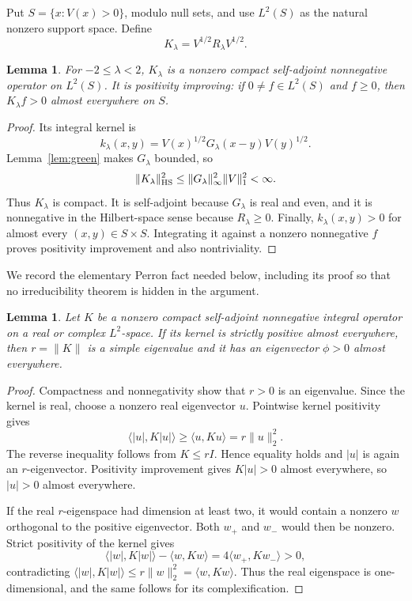 \documentclass[11pt]{article}
\newtheorem{lemma}[theorem]{Lemma}
\begin{document}
Put $S=\{x:V(x)>0\}$, modulo null sets, and use $L^2(S)$ as the natural
nonzero support space.  Define
\[
 K_\lambda=V^{1/2}R_\lambda V^{1/2}.
\]

\begin{lemma}\label{lem:K}
For $-2\le\lambda<2$, $K_\lambda$ is a nonzero compact self-adjoint
nonnegative operator on $L^2(S)$.  It is positivity improving: if
$0\ne f\in L^2(S)$ and $f\ge0$, then $K_\lambda f>0$ almost everywhere on
$S$.
\end{lemma}

\begin{proof}
Its integral kernel is
\[
 k_\lambda(x,y)=V(x)^{1/2}G_\lambda(x-y)V(y)^{1/2}.
\]
Lemma~\ref{lem:green} makes $G_\lambda$ bounded, so
\[
 \|K_\lambda\|_{\rm HS}^2
 \le \|G_\lambda\|_\infty^2\|V\|_1^2<\infty.
\]
Thus $K_\lambda$ is compact.  It is self-adjoint because $G_\lambda$ is real
and even, and it is nonnegative in the Hilbert-space sense because
$R_\lambda\ge0$.  Finally, $k_\lambda(x,y)>0$ for almost every $(x,y)\in
S\times S$.  Integrating it against a nonzero nonnegative $f$ proves
positivity improvement and also nontriviality.
\end{proof}

We record the elementary Perron fact needed below, including its proof so that
no irreducibility theorem is hidden in the argument.

\begin{lemma}\label{lem:perron}
Let $K$ be a nonzero compact self-adjoint nonnegative integral operator on a
real or complex $L^2$-space.  If its kernel is strictly positive almost
everywhere, then $r=\|K\|$ is a simple eigenvalue and it has an eigenvector
$\phi>0$ almost everywhere.
\end{lemma}

\begin{proof}
Compactness and nonnegativity show that $r>0$ is an eigenvalue.  Since the
kernel is real, choose a nonzero real eigenvector $u$.  Pointwise kernel
positivity gives
\[
 \langle |u|,K|u|\rangle\ge \langle u,Ku\rangle=r\|u\|_2^2.
\]
The reverse inequality follows from $K\le rI$.  Hence equality holds and
$|u|$ is again an $r$-eigenvector.  Positivity improvement gives
$K|u|>0$ almost everywhere, so $|u|>0$ almost everywhere.

If the real $r$-eigenspace had dimension at least two, it would contain a
nonzero $w$ orthogonal to the positive eigenvector.  Both $w_+$ and $w_-$
would then be nonzero.  Strict positivity of the kernel gives
\[
 \langle |w|,K|w|\rangle-\langle w,Kw\rangle
 =4\langle w_+,Kw_-\rangle>0,
\]
contradicting $\langle |w|,K|w|\rangle\le r\|w\|_2^2=
\langle w,Kw\rangle$.  Thus the real eigenspace is one-dimensional, and the
same follows for its complexification.
\end{proof}
\end{document}
